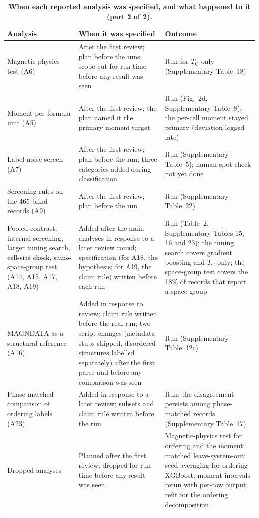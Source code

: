\documentclass[pdflatex,sn-nature]{sn-jnl}
\newcommand{\Tc}{\ensuremath{T_\mathrm{C}}}
\begin{document}
\begin{table}[!ht]
\caption{\textbf{When each reported analysis was specified, and what happened to it (part 2 of 2).}}\label{tab:s14}%
\setlength{\tabcolsep}{3pt}%
\begin{tabular}{@{}>{\raggedright\arraybackslash}p{88pt}>{\raggedright\arraybackslash}p{150pt}>{\raggedright\arraybackslash}p{116pt}@{}}
\toprule
Analysis & When it was specified & Outcome \\
\midrule
Magnetic-physics test (A6) & After the first review; plan before the runs; scope cut for run time before any result was seen & Run for \Tc{} only (Supplementary Table~18) \\
Moment per formula unit (A5) & After the first review; the plan named it the primary moment target & Run (Fig.~2d, Supplementary Table~8); the per-cell moment stayed primary (deviation logged late) \\
Label-noise screen (A7) & After the first review; plan before the run; three categories added during classification & Run (Supplementary Table~5); human spot check not yet done \\
Screening rules on the 465 blind records (A9) & After the first review; plan before the run & Run (Supplementary Table~22) \\
Pooled contrast, internal screening, larger tuning search, cell-size check, same-space-group test (A14, A15, A17, A18, A19) & Added after the main analyses in response to a later review round; specification (for A18, the hypothesis; for A19, the claim rule) written before each run & Run (Table~2, Supplementary Tables 15, 16 and 23); the tuning search covers gradient boosting and \Tc{} only; the space-group test covers the 18\% of records that report a space group \\
MAGNDATA as a structural reference (A16) & Added in response to review; claim rule written before the real run; two script changes (metadata stubs skipped, disordered structures labelled separately) after the first parse and before any comparison was seen & Run (Supplementary Table~12c) \\
Phase-matched comparison of ordering labels (A23) & Added in response to a later review; subsets and claim rule written before the run & Run; the disagreement persists among phase-matched records (Supplementary Table~17) \\
Dropped analyses & Planned after the first review; dropped for run time before any result was seen & Magnetic-physics test for ordering and the moment; matched leave-system-out; seed averaging for ordering XGBoost; moment intervals rerun with per-row output; refit for the ordering decomposition \\
\botrule
\end{tabular}
\end{table}
\end{document}
